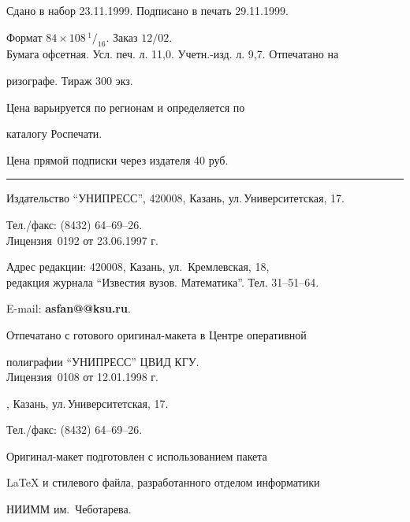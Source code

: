 \setlength{\hoffset}{-23mm}


\bigskip


\noindent Сдано в набор 23.11.1999. Подписано в печать 29.11.1999.


Формат $84\times 108 \,^1/_{16}.$ Заказ $12/02$.\\


Бумага офсетная. Усл. печ. л. 11,0. Учетн.-изд. л. 9,7. Отпечатано на 


ризографе. Тираж 300 экз. 





\noindent Цена варьируется по регионам и определяется по 


каталогу Роспечати. 





\noindent Цена прямой подписки через издателя 40 руб. 


\bigskip


\hrule


\bigskip


\noindent Издательство ``УНИПРЕСС'', 420008, Казань, ул.\,Университетская, 17.


Тел./факс: (8432) 64--69--26.\\


Лицензия \No\,0192 от 23.06.1997 г.


\smallskip





\noindent Адрес редакции: 420008, Казань, ул.~Кремлевская, 18,\\  


редакция журнала  ``Известия вузов. Математика''. Тел. 31--51--64.





\noindent E-mail: {\bf asfan@@ksu.ru}. \par


\bigskip 


\noindent Отпечатано с готового оригинал-макета в Центре оперативной


полиграфии ``УНИПРЕСС'' ЦВИД КГУ. \\


Лицензия \No\,0108 от 12.01.1998 г.





, Казань, ул.\,Университетская, 17.


Тел./факс: (8432) 64--69--26. \par


\bigskip


\noindent Оригинал-макет подготовлен с использованием пакета


\AmS\LaTeX{} и стилевого файла, разработанного отделом информатики


НИИММ им.~Чеботарева.








